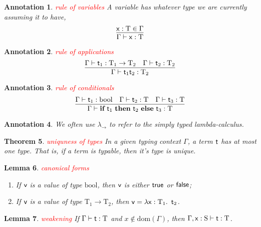 \documentclass{article}
\theoremstyle{plain}
\newtheorem{theorem}{Theorem}
\newtheorem{lemma}[theorem]{Lemma}
\newtheorem{annotation}[theorem]{Annotation}
\theoremstyle{nonumberplain}
\newcommand{\lam}[2]{\ensuremath{\lambda #1\ldotp~ #2}} %
\newcommand{\singletype}[1]{\text{#1}}
\newcommand{\termtype}[2]{\ensuremath{#1:#2}}
\newcommand{\term}[1]{\ensuremath\mathsf{#1}}
\newcommand{\ifelse}[3]{\ensuremath{\textbf{if}~#1~\textbf{then}~#2~\textbf{else}~#3}}
\newcommand{\redt}[1]{\textcolor{red}{#1}}
\begin{document}
\begin{annotation}
\rm \redt{rule of variables} A variable has whatever type we are currently assuming it to have,
$$
\infer{\Gamma \vdash \termtype{\term{x}}{\singletype{T}}}{\termtype{\term{x}}{\singletype{T}} \in \Gamma}
$$
\end{annotation}


\begin{annotation}
\rm \redt{rule of applications}
$$
\infer{\Gamma \vdash \termtype{\term{t}_1 \term{t}_2}{\singletype{T}_2}}{\Gamma	\vdash \termtype{\term{t}_1}{\singletype{T}_1 \to \singletype{T}_2 } & \Gamma \vdash \termtype{\term{t}_2}{\singletype{T}_2} }
$$
\end{annotation}

\begin{annotation}
\rm \redt{rule of conditionals}  
$$
\infer{\Gamma \vdash \termtype{\ifelse{\term{t}_1}{\term{t}_2}{\term{t}_3}}{\singletype{T}}}{\Gamma \vdash \termtype{\term{t}_1}{\singletype{bool}} & \Gamma \vdash \termtype{\term{t}_2}{\singletype{T}} & \Gamma \vdash \termtype{\term{t}_3}{\singletype{T}}}
$$
\end{annotation}


\begin{annotation}
\rm We often use $\lambda_{\to}$ to refer to the simply typed lambda-calculus. 
\end{annotation}

\begin{theorem}
\rm \redt{uniquness of types} In a given typing context $\Gamma$, a term $\term{t}$ has at most one type. That is, if a term is typable, then it's type is unique. 
\end{theorem}

\begin{lemma}
\rm \redt{canonical forms}
\begin{enumerate}
	\item If $\term{v}$ is a value of type $\singletype{bool}$, then $\term{v}$ is either $\term{true}$ or $\term{false}$;
	\item If $\term{v}$ is a value of type $\singletype{T}_1\to\singletype{T}_2$, then $\term{v} = \lam{\termtype{\term{x}}{\singletype{T}_1}}{\term{t}_2}$.
\end{enumerate}
\end{lemma}

\begin{lemma}
\rm \redt{weakening} If $\Gamma \vdash \termtype{\term{t}}{\singletype{T}}$ and $x \notin \text{dom}(\Gamma)$, then $\Gamma, \termtype{\term{x}}{\singletype{S}} \vdash \termtype{\term{t}}{\singletype{T}}$.
\end{lemma}
\end{document}
